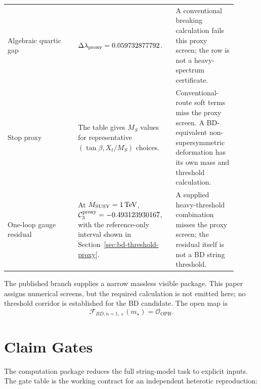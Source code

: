 \documentclass[11pt]{article}
\theoremstyle{remark}
\theoremstyle{plain}
\newcommand{\OPH}{\mathrm{OPH}}
\newcommand{\calF}{\mathcal F}
\newcommand{\calO}{\mathcal O}
\begin{document}
\begin{longtable}{p{0.29\linewidth}p{0.37\linewidth}p{0.24\linewidth}}
Algebraic quartic gap & \(\Delta\lambda_{\rm proxy}=0.059732877792\). & A conventional
breaking calculation fails this proxy screen; the row is not a heavy-spectrum certificate. \\
Stop proxy & The table gives \(M_S\) values for representative
\((\tan\beta,X_t/M_S)\) choices. & Conventional-route soft terms miss the proxy screen. A
BD-equivalent non-supersymmetric deformation has its own mass and threshold calculation. \\
One-loop gauge residual & At \(M_{\rm SUSY}=1\,\mathrm{TeV}\),
\(\mathcal C_3^{\rm proxy}=-0.493123930167\), with the reference-only interval shown in
Section~\ref{sec:bd-threshold-proxy}. & A supplied heavy-threshold combination misses the proxy
screen; the residual itself is not a BD string threshold. \\
\bottomrule
\end{longtable}

The published branch supplies a narrow massless visible package. This paper assigns numerical
screens, but the required calculation is not emitted here; no threshold corridor is established
for the BD candidate.
The open map is
\[
\calF_{BD,n=1,+}(m_\star)=\calO_{\OPH}.
\]

\section{Claim Gates}\label{sec:claim-gates}

The computation package reduces the full string-model task to explicit inputs. The gate table is
the working contract for an independent heterotic reproduction:
\end{document}
